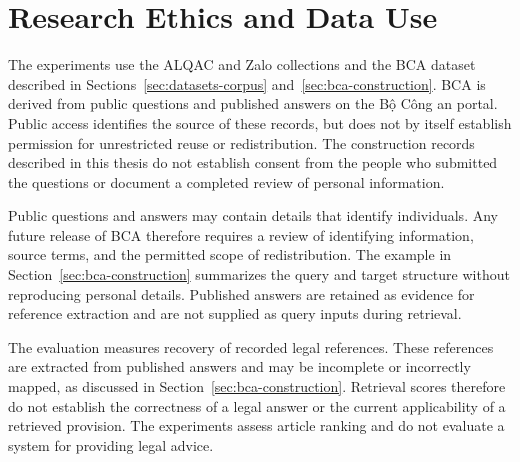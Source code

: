 \section{Research Ethics and Data Use}
\label{sec:ethics-data}

The experiments use the ALQAC and Zalo collections and the BCA dataset described in Sections~\ref{sec:datasets-corpus} and~\ref{sec:bca-construction}. BCA is derived from public questions and published answers on the Bộ Công an portal. Public access identifies the source of these records, but does not by itself establish permission for unrestricted reuse or redistribution. The construction records described in this thesis do not establish consent from the people who submitted the questions or document a completed review of personal information.

Public questions and answers may contain details that identify individuals. Any future release of BCA therefore requires a review of identifying information, source terms, and the permitted scope of redistribution. The example in Section~\ref{sec:bca-construction} summarizes the query and target structure without reproducing personal details. Published answers are retained as evidence for reference extraction and are not supplied as query inputs during retrieval.

The evaluation measures recovery of recorded legal references. These references are extracted from published answers and may be incomplete or incorrectly mapped, as discussed in Section~\ref{sec:bca-construction}. Retrieval scores therefore do not establish the correctness of a legal answer or the current applicability of a retrieved provision. The experiments assess article ranking and do not evaluate a system for providing legal advice.
